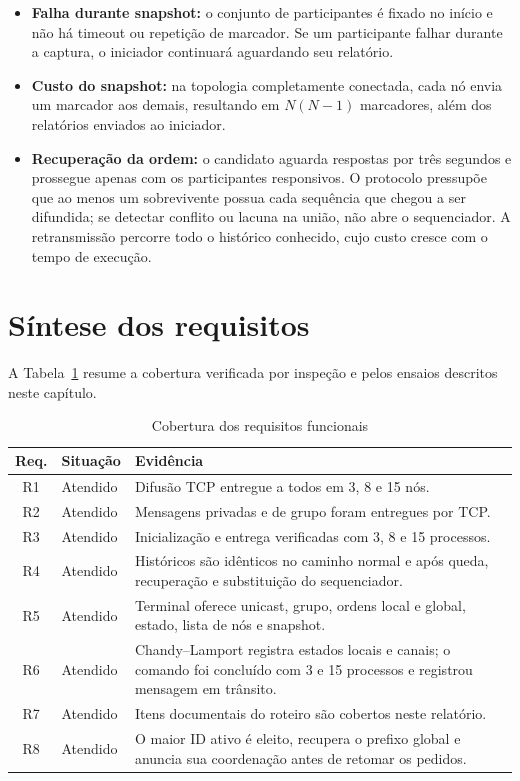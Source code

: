 \begin{itemize}
    \item \textbf{Falha durante snapshot:} o conjunto de participantes é fixado no
    início e não há timeout ou repetição de marcador. Se um participante falhar
    durante a captura, o iniciador continuará aguardando seu relatório.
    \item \textbf{Custo do snapshot:} na topologia completamente conectada, cada
    nó envia um marcador aos demais, resultando em $N(N-1)$ marcadores, além dos
    relatórios enviados ao iniciador.
    \item \textbf{Recuperação da ordem:} o candidato aguarda respostas por três
    segundos e prossegue apenas com os participantes responsivos. O protocolo
    pressupõe que ao menos um sobrevivente possua cada sequência que chegou a ser
    difundida; se detectar conflito ou lacuna na união, não abre o sequenciador.
    A retransmissão percorre todo o histórico conhecido, cujo custo cresce com o
    tempo de execução.
\end{itemize}

\section{Síntese dos requisitos}

A Tabela~\ref{tab:requisitos} resume a cobertura verificada por inspeção e pelos
ensaios descritos neste capítulo.

\begin{table}[H]
    \centering
    \caption{Cobertura dos requisitos funcionais}
    \label{tab:requisitos}
    \begin{tabular}{c p{3.3cm} p{8.7cm}}
        \toprule
        \textbf{Req.} & \textbf{Situação} & \textbf{Evidência} \\
        \midrule
        R1 & Atendido & Difusão TCP entregue a todos em 3, 8 e 15 nós. \\
        R2 & Atendido & Mensagens privadas e de grupo foram entregues por TCP. \\
        R3 & Atendido & Inicialização e entrega verificadas com 3, 8 e 15 processos. \\
        R4 & Atendido & Históricos são idênticos no caminho normal e após queda,
        recuperação e substituição do sequenciador. \\
        R5 & Atendido & Terminal oferece unicast, grupo, ordens local e global,
        estado, lista de nós e snapshot. \\
        R6 & Atendido & Chandy--Lamport registra estados locais e canais; o comando
        foi concluído com 3 e 15 processos e registrou mensagem em trânsito. \\
        R7 & Atendido & Itens documentais do roteiro são cobertos neste relatório. \\
        R8 & Atendido & O maior ID ativo é eleito, recupera o prefixo global e
        anuncia sua coordenação antes de retomar os pedidos. \\
        \bottomrule
    \end{tabular}
\end{table}
